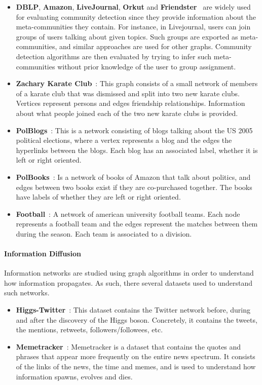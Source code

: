 \begin{itemize}
  \item \textbf{DBLP}, \textbf{Amazon}, \textbf{LiveJournal}, \textbf{Orkut} and \textbf{Friendster}~\cite{yang2015defining}
    are widely used for evaluating community detection since they provide
    information about the meta-communities they contain. For instance, in
    Livejournal, users can join groups of users talking about given topics. Such
    groups are exported as meta-communities, and similar approaches are used for
    other graphs. Community detection algorithms are then evaluated by trying to
    infer such meta-communities without prior knowledge of the user to group
    assignment.
  \item \textbf{Zachary Karate Club}~\cite{zachary1977information}: This graph consists
    of a small network of members of a karate club that was dismissed and split
    into two new karate clubs. Vertices represent persons and edges friendship
    relationships. Information about what people joined each of the two new
    karate clubs is provided.
  \item \textbf{PolBlogs}~\cite{adamic2005political}: This is a network consisting of
    blogs talking about the US 2005 political elections, where a vertex
    represents a blog and the edges the hyperlinks between the blogs. Each blog
    has an associated label, whether it is left or right oriented.
  \item \textbf{PolBooks}~\cite{10dimacs}: Is a network of books of Amazon that talk
    about politics, and edges between two books exist if they are co-purchased
    together. The books have labels of whether they are left or right oriented.
  \item \textbf{Football}~\cite{girvan2002network}: A network of american university
    football teams. Each node represents a football team and the edges represent
    the matches between them during the season. Each team is associated to a
    division.
\end{itemize}

\paragraph{Information Diffusion}

Information networks are studied using graph algorithms in order to understand
how information propagates. As such, there several datasets used to understand
such networks.

\begin{itemize}
  \item \textbf{Higgs-Twitter}~\cite{de2013anatomy}: This dataset contains the Twitter
    network before, during and after the discovery of the Higgs boson.
    Concretely, it contains the tweets, the mentions, retweets,
    followers/followees, etc.
  \item \textbf{Memetracker}~\cite{leskovec2009meme}: Memetracker is a dataset that
    contains the quotes and phrases that appear more frequently on the entire
    news spectrum. It consists of the links of the news, the time and memes, and
    is used to understand how information spawns, evolves and dies.
\end{itemize}

